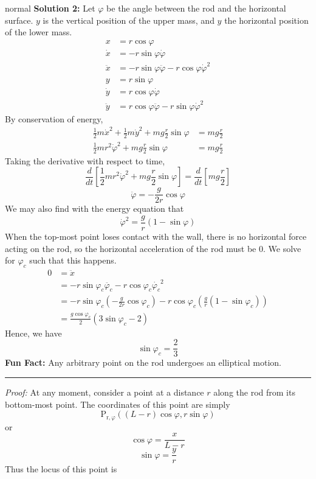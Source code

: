 \begin{solution}{normal}
\textbf{Solution 2:} Let $\varphi$ be the angle between the rod and the horizontal surface. $y$ is the vertical position of the upper mass, and $y$ the horizontal position of the lower mass.
\begin{align*}
x &= r \cos \varphi  \\
\dot{x} &= - r \sin \varphi \dot{\varphi} \\
\ddot{x} &= - r \sin \varphi \ddot{\varphi} - r \cos \varphi  \dot{\varphi}^2 \\
y &= r \sin \varphi \\
\dot{y} &= r \cos \varphi \dot{\varphi} \\
\ddot{y} &= r \cos \varphi \ddot{\varphi} - r \sin \varphi \dot{\varphi}^2
\end{align*}By conservation of energy,
\begin{align*}
\frac{1}{2} m \dot{x}^2 + \frac{1}{2} m \dot{y}^2 + mg\frac{r}{2} \sin \varphi &= mg\frac{r}{2} \\
\frac{1}{2} m r^2 \dot{\varphi}^2 + mg\frac{r}{2} \sin \varphi &= mg\frac{r}{2}
\end{align*}Taking the derivative with respect to time,
$$
\frac{d}{dt} \left[ \frac{1}{2} m r^2 \dot{\varphi}^2 + mg\frac{r}{2} \sin \varphi \right] = \frac{d}{dt} \left[ mg\frac{r}{2} \right] $$$$ \ddot{\varphi} = - \frac{g}{2r} \cos \varphi  $$We may also find with the energy equation that
$$ \dot{\varphi}^2 =  \frac{g}{r} (1 - \sin \varphi) $$When the top-most point loses contact with the wall, there is no horizontal force acting on the rod, so the horizontal acceleration of the rod must be $0$. We solve for $\varphi_c$ such that this happens.
\begin{align*} 
0 &= \ddot{x} \\
&= - r \sin \varphi_c \ddot{\varphi_c} - r \cos \varphi_c  \dot{\varphi_c}^2 \\
&= -r \sin \varphi_c \left( - \frac{g}{2r} \cos \varphi_c \right) - r \cos \varphi_c \left( \frac{g}{r} (1 - \sin \varphi_c) \right) \\
&= \frac{g \cos \varphi_c}{2} (3 \sin \varphi_c - 2)
\end{align*}Hence, we have$$\boxed{\sin \varphi_c = \frac{2}{3}}$$
\tcbline
\textbf{\textcolor{crimsonglory}{Fun Fact:}} Any arbitrary point on the rod undergoes an elliptical motion.
\begin{center}
\noindent\rule{8cm}{0.4pt}
\end{center}
\textit{Proof:} At any moment, consider a point at a distance $r$ along the rod from its bottom-most point. The coordinates of this point are simply $$\text{P}_{\text{r},\varphi}((L-r)\cos{\varphi},r\sin{\varphi})$$ or $$\cos{\varphi} = \frac{x}{L-r}$$ $$\sin{\varphi} = \frac{y}{r}$$ Thus the locus of this point is \begin{align*} 

\end{align*}
\end{solution}
